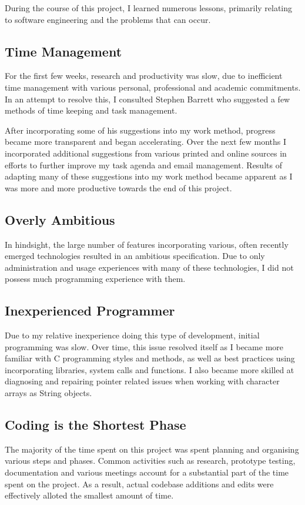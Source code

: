 
During the course of this project, I learned numerous lessons, primarily
relating to software engineering and the problems that can occur.

\subsection{Time Management}

For the first few weeks, research and productivity was slow, due to
inefficient time management with various personal, professional and
academic commitments. In an attempt to resolve this, I consulted
Stephen Barrett who suggested a few methods of time keeping and task
management.


After incorporating some of his suggestions into my work method,
progress became more transparent and began accelerating. Over the next
few months I incorporated additional suggestions from various printed
and online sources in efforts to further improve my task agenda and 
email management. Results of adapting many of these suggestions into my
work method became apparent as I was more and more productive towards
the end of this project.

\subsection{Overly Ambitious}

In hindsight, the large number of features incorporating various, often
recently emerged technologies resulted in an ambitious specification.
Due to only administration and usage experiences with many of these
technologies, I did not possess much  programming experience with them.

\subsection{Inexperienced Programmer}

Due to my relative inexperience doing this type of development, initial
programming was slow. Over time, this issue resolved itself as I became
more familiar with C programming styles and methods, as well as best
practices using incorporating libraries, system calls and functions. I
also became more skilled at diagnosing and repairing pointer related 
issues when working with character arrays as String objects.

\subsection{Coding is the Shortest Phase}

The majority of the time spent on this project was spent planning and
organising various steps and phases. Common activities such as research,
prototype testing, documentation and various meetings account for a 
substantial part of the time spent on the project. As a result, actual 
codebase additions and edits were effectively alloted the smallest 
amount of time.

